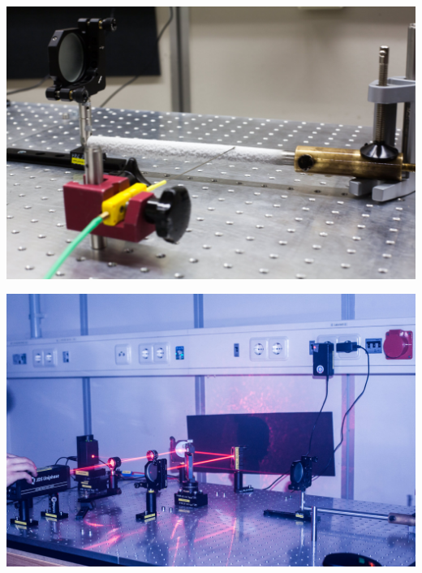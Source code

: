 \documentclass[compress,11pt]{beamer}
\begin{document}
\begin{frame}
	\includegraphics[width=\textwidth]{images/2/interferrometer-2}
\end{frame}

\begin{frame}
	\includegraphics[width=\textwidth]{images/2/interferrometer-6}
\end{frame}
\end{document}
